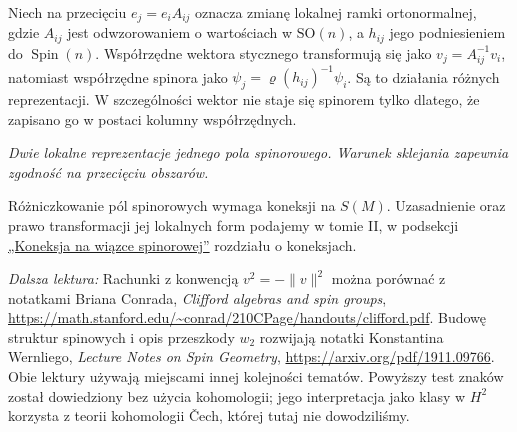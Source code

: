 \begin{uwaga}
\label{rem:pola-spinorowe-ramki}
Niech na przecięciu $e_j=e_i A_{ij}$ oznacza zmianę
lokalnej ramki ortonormalnej, gdzie $A_{ij}$ jest
odwzorowaniem o wartościach w $\mathrm{SO}(n)$,
a $h_{ij}$ jego podniesieniem do $\operatorname{Spin}(n)$.
Współrzędne wektora stycznego transformują się jako
$v_j=A_{ij}^{-1}v_i$, natomiast współrzędne spinora
jako $\psi_j=\varrho(h_{ij})^{-1}\psi_i$.
Są to działania różnych reprezentacji. W szczególności
wektor nie staje się spinorem tylko dlatego, że zapisano go
w postaci kolumny współrzędnych.
\end{uwaga}

\begin{center}

{\small\itshape Dwie lokalne reprezentacje jednego pola spinorowego.
Warunek sklejania zapewnia zgodność na przecięciu obszarów.}
\end{center}

Różniczkowanie pól spinorowych wymaga koneksji na $S(M)$.
Uzasadnienie oraz prawo transformacji jej lokalnych form
podajemy w tomie II, w podsekcji
\hyperref[sec:koneksja-spinorowa-transformacja]{„Koneksja na wiązce spinorowej”}
rozdziału o koneksjach.


\par\smallskip
{\footnotesize\noindent\emph{Dalsza lektura:}
Rachunki z konwencją $v^2=-\|v\|^2$
można porównać z notatkami Briana Conrada,
\emph{Clifford algebras and spin groups},
\url{https://math.stanford.edu/~conrad/210CPage/handouts/clifford.pdf}.
Budowę struktur spinowych i opis przeszkody
$w_2$ rozwijają notatki Konstantina Wernliego,
\emph{Lecture Notes on Spin Geometry},
\url{https://arxiv.org/pdf/1911.09766}.
Obie lektury używają miejscami innej kolejności tematów.
Powyższy test znaków został dowiedziony bez użycia kohomologii;
jego interpretacja jako klasy w $H^2$ korzysta z teorii
kohomologii Čech, której tutaj nie dowodziliśmy.\par}
\clearpage
